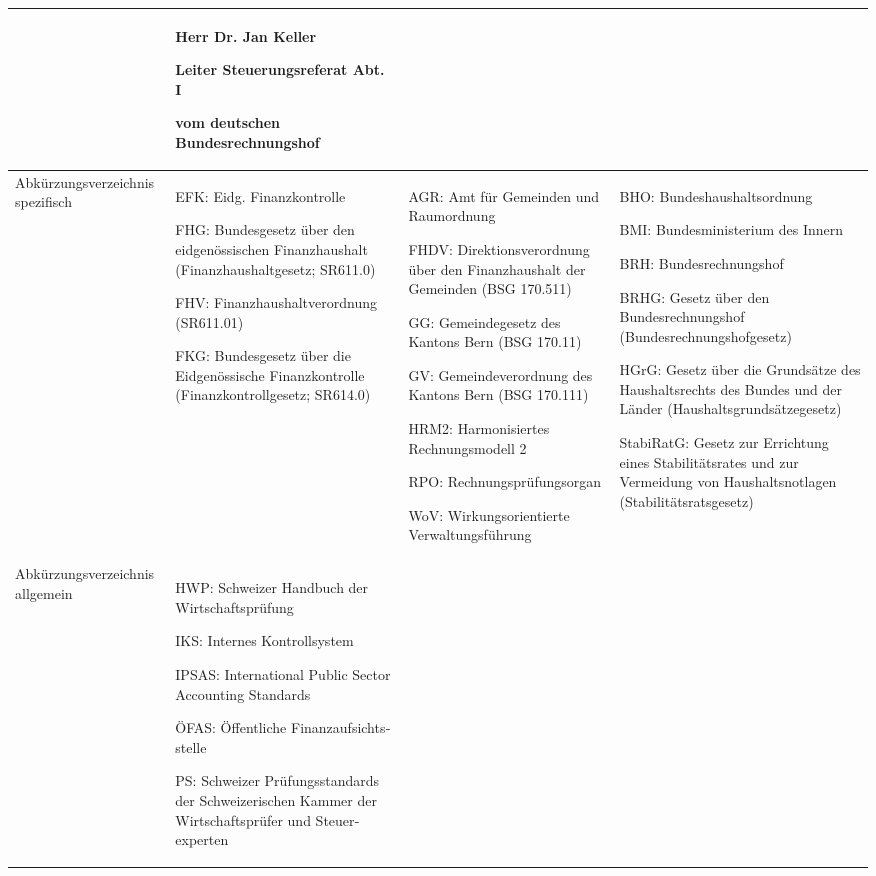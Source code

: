 \documentclass[10pt]{article}
\begin{document}
\begin{landscape}
\begin{center}
\begin{longtable}{|p{4cm}|p{5cm}|p{7.5cm}|p{7.5cm}|}
 & Herr Dr. Jan Keller

Leiter Steuerungsreferat Abt. I

vom deutschen Bundesrechnungshof

 \\
\hline
Abkürzungsverzeichnis spezifisch & EFK: Eidg. Finanzkontrolle

FHG: Bundesgesetz über den eidgenössischen Finanzhaushalt (Finanzhaushaltgesetz; SR611.0)

FHV: Finanzhaushaltverordnung (SR611.01)

FKG: Bundesgesetz über die Eidgenössische Finanzkontrolle (Finanzkontrollgesetz; SR614.0)

 & AGR: Amt für Gemeinden und Raumordnung

FHDV: Direktionsverordnung über den Finanzhaushalt der Gemeinden (BSG 170.511)

GG: Gemeindegesetz des Kantons Bern (BSG 170.11)

GV: Gemeindeverordnung des Kantons Bern (BSG 170.111)

HRM2: Harmonisiertes Rechnungsmodell 2

RPO: Rechnungsprüfungsorgan

WoV: Wirkungsorientierte Verwaltungsführung

 & BHO: Bundeshaushalts­ordnung

BMI: Bundesministerium des Innern

BRH: Bundesrechnungshof

BRHG: Gesetz über den Bundesrechnungshof (Bundesrechnungshofgesetz)

HGrG: Gesetz über die Grundsätze des Haushalts­rechts des Bundes und der Länder (Haushaltsgrundsätzegesetz)

StabiRatG: Gesetz zur Errichtung eines Stabilitätsrates und zur Vermeidung von Haushaltsnotlagen (Stabilitätsratsgesetz)

 \\
\hline
Abkürzungsverzeichnis allgemein & HWP: Schweizer Handbuch der Wirtschaftsprüfung

IKS: Internes Kontrollsystem

IPSAS: International Public Sector Accounting Standards

ÖFAS: Öffentliche Finanzauf­sichts­stelle

PS: Schweizer Prüfungsstandards der Schweizerischen Kammer der Wirtschaftsprüfer und Steuer­experten

 &  &  \\
\hline
\end{longtable}
\end{center}
\end{landscape}
\restoregeometry
\end{document}
